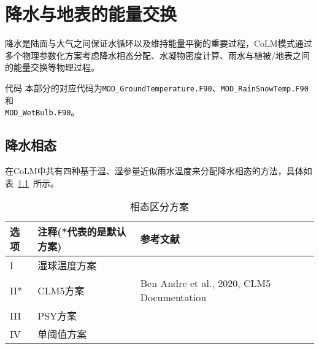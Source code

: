 \chapter{降水与地表的能量交换}
降水是陆面与大气之间保证水循环以及维持能量平衡的重要过程，CoLM模式通过多个物理参数化方案考虑降水相态分配、水凝物密度计算、雨水与植被/地表之间的能量交换等物理过程。

\begin{mymdframed}{代码}
  本部分的对应代码为\texttt{MOD\_GroundTemperature.F90}、\texttt{MOD\_RainSnowTemp.F90}和\\
  \texttt{MOD\_WetBulb.F90}。
\end{mymdframed}

\section{降水相态}\label{相态分配}
在CoLM中共有四种基于温、湿参量近似雨水温度来分配降水相态的方法，具体如表~\ref{tab:相态区分方案}~所示。

\begin{table}[]
  \caption{相态区分方案}
  \label{tab:相态区分方案}
  \begin{tabular}[h]{p{1cm}p{5cm}p{10cm}}
    \toprule
    选项 & 注释(*代表的是默认方案) & 参考文献                                   \\ \midrule
    I    & 湿球温度方案            & \citet{Wang-etal_19WetBulb}                \\
    II*  & CLM5方案                & Ben Andre et al., 2020, CLM5 Documentation \\
    III  & PSY方案                 & \citet{harder2013estimating}               \\
    IV   & 单阈值方案              & \citet{us1956snow}                         \\ \bottomrule
  \end{tabular}
\end{table}

